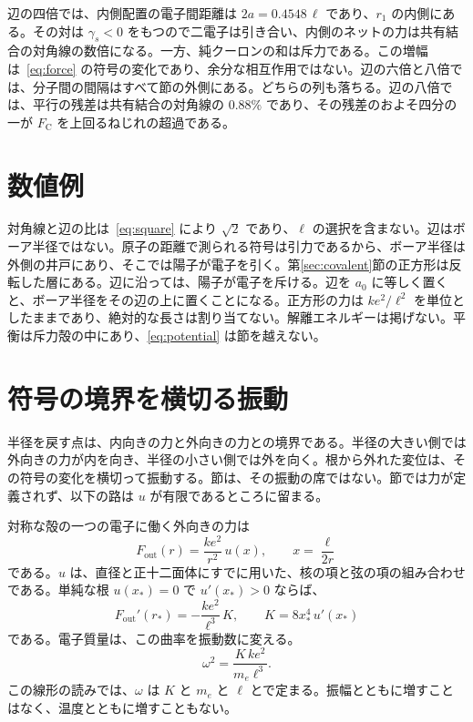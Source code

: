 \documentclass[a4paper]{article}
\begin{document}
辺の四倍では、内側配置の電子間距離は \(2a=0.4548\,\ell\) であり、\(r_1\) の内側にある。その対は \(\gamma_s<0\) をもつので二電子は引き合い、内側のネットの力は共有結合の対角線の数倍になる。一方、純クーロンの和は斥力である。この増幅は~\eqref{eq:force} の符号の変化であり、余分な相互作用ではない。辺の六倍と八倍では、分子間の間隔はすべて節の外側にある。どちらの列も落ちる。辺の八倍では、平行の残差は共有結合の対角線の \(0.88\%\) であり、その残差のおよそ四分の一が \(F_{\mathrm{C}}\) を上回るねじれの超過である。

\section{数値例}
\label{sec:numbers}

対角線と辺の比は~\eqref{eq:square} により \(\sqrt{2}\) であり、\(\ell\) の選択を含まない。辺はボーア半径ではない。原子の距離で測られる符号は引力であるから、ボーア半径は外側の井戸にあり、そこでは陽子が電子を引く。第\ref{sec:covalent}節の正方形は反転した層にある。辺に沿っては、陽子が電子を斥ける。辺を \(a_0\) に等しく置くと、ボーア半径をその辺の上に置くことになる。正方形の力は \(k e^{2}/\ell^{2}\) を単位としたままであり、絶対的な長さは割り当てない。解離エネルギーは掲げない。平衡は斥力殻の中にあり、\eqref{eq:potential} は節を越えない。

\section{符号の境界を横切る振動}
\label{sec:heat}

半径を戻す点は、内向きの力と外向きの力との境界である。半径の大きい側では外向きの力が内を向き、半径の小さい側では外を向く。根から外れた変位は、その符号の変化を横切って振動する。節は、その振動の席ではない。節では力が定義されず、以下の路は \(u\) が有限であるところに留まる。

対称な殻の一つの電子に働く外向きの力は
\begin{equation}
\label{eq:Fout}
F_{\mathrm{out}}(r)=\frac{k e^{2}}{r^{2}}\,u(x),
\qquad
x=\frac{\ell}{2r}
\end{equation}
である。\(u\) は、直径と正十二面体にすでに用いた、核の項と弦の項の組み合わせである。単純な根 \(u(x_*)=0\) で \(u'(x_*)>0\) ならば、
\begin{equation}
\label{eq:curv}
F_{\mathrm{out}}'(r_*)=-\frac{k e^{2}}{\ell^{3}}\,K,
\qquad
K=8x_*^4\,u'(x_*)
\end{equation}
である。電子質量は、この曲率を振動数に変える。
\begin{equation}
\label{eq:omega}
\omega^{2}=\frac{K\,k e^{2}}{m_e\ell^{3}}.
\end{equation}
この線形の読みでは、\(\omega\) は \(K\) と \(m_e\) と \(\ell\) とで定まる。振幅とともに増すことはなく、温度とともに増すこともない。
\end{document}
